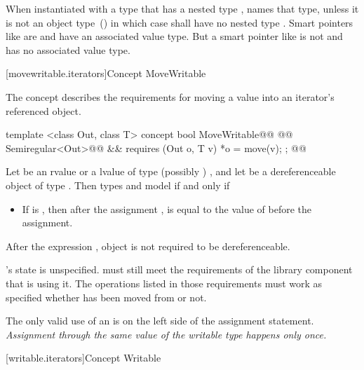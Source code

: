 \begin{addedblock}
\pnum
When instantiated with a type  that has a nested type ,
 names that type, unless it is not an object type~() in which case
 shall have no nested type . \enternote Smart pointers like
 are  and have an associated value type. But a smart pointer
like  is not  and has no associated value type.\exitnote

[movewritable.iterators]{Concept MoveWritable}

\pnum
The  concept describes the requirements for moving a value into an iterator's
referenced object.

%
\begin{codeblock}
  template <class Out, class T>
  concept bool MoveWritable@\newtxt{() \{}\oldtxt{ =}@
    @@ Semiregular<Out>@\newtxt{()}@ &&
      requires (Out o, T v) {
        *o = move(v);
      };
  @\newtxt{\}}@
\end{codeblock}

\pnum
Let  be an rvalue or a lvalue of type (possibly ) , and let 
be a dereferenceable object of type . Then types  and
 model  if and only if

\begin{itemize}
\item If  is ,
then after the assignment ,  is equal
to the value of  before the assignment.
\end{itemize}

\pnum
After the expression , object  is not required to be dereferenceable.

\pnum
{}'s state is unspecified. \enternote {} must still meet the
requirements of the library component that is using it. The operations listed
in those requirements must work as specified whether  has been moved
from or not.\exitnote

\pnum
\enternote
The only valid use of an  is on the left side of the assignment statement.
\textit{Assignment through the same value of the writable type happens only once.}
\exitnote

[writable.iterators]{Concept Writable}


\end{addedblock}
